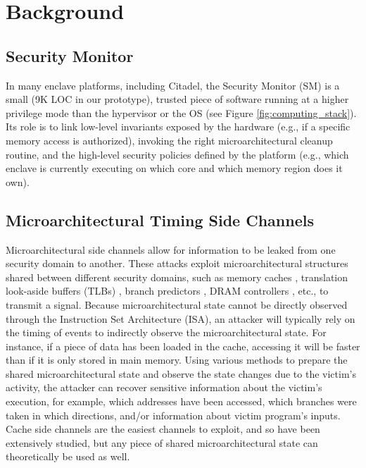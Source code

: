 \section{Background}

\subsection{Security Monitor}
\label{sec:securitymonitor}
In many enclave platforms, including Citadel, the Security Monitor (SM) \cite{costan2016sanctum} \cite{lebedev2019sanctorum} is a small (9K LOC in our prototype), trusted piece of software running at a higher privilege mode than the hypervisor or the OS (see Figure \ref{fig:computing_stack}).
Its role is to link low-level invariants exposed by the hardware (e.g., if a specific memory access is authorized), invoking the right microarchitectural cleanup routine, and the high-level security policies defined by the platform (e.g., which enclave is currently executing on which core and which memory region does it own).

\subsection{Microarchitectural Timing Side Channels}
Microarchitectural side channels allow for information to be leaked from one security domain to another.
These attacks exploit microarchitectural structures shared between different security domains, such as memory caches \cite{gotzfried2017cache, brasser2017software}, translation look-aside buffers (TLBs) \cite{gras2018translation}, branch predictors \cite{evtyushkin2018branchscope, aciiccmez2006predicting}, DRAM controllers \cite{wang2014timing}, etc., to transmit a signal.
Because microarchitectural state cannot be directly observed through the Instruction Set Architecture (ISA), an attacker will typically rely on the timing of events to indirectly observe the microarchitectural state.
For instance, if a piece of data has been loaded in the cache, accessing it will be faster than if it is only stored in main memory.
Using various methods to prepare the shared microarchitectural state and observe the state changes due to the victim's activity, the attacker can recover sensitive information  about the victim's execution, for example, which addresses have been accessed, which branches were taken in which directions, and/or information about victim program's inputs.
Cache side channels are the easiest channels to exploit, and so have been extensively studied, but any piece of shared microarchitectural state can theoretically be used as well.


